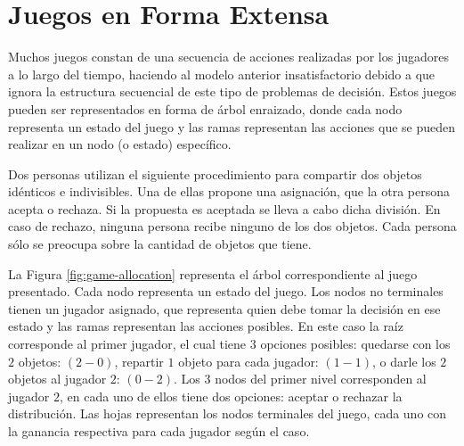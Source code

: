 \chapter{Juegos en Forma Extensa}
\label{chapter:juegos-forma-extensa}

Muchos juegos constan de una secuencia de acciones realizadas por los jugadores a lo largo del tiempo, haciendo al modelo anterior insatisfactorio debido a que ignora la estructura secuencial de este tipo de problemas de decisión. Estos juegos pueden ser representados en forma de árbol enraizado, donde cada nodo representa un estado del juego y las ramas representan las acciones que se pueden realizar en un nodo (o estado) específico. 

\begin{example}
\label{ex:game-allocation}
Dos personas utilizan el siguiente procedimiento para compartir dos objetos idénticos e indivisibles. Una de ellas propone una asignación, que la otra persona acepta o rechaza. Si la propuesta es aceptada se lleva a cabo dicha división. En caso de rechazo, ninguna persona recibe ninguno de los dos objetos. Cada persona sólo se preocupa sobre la cantidad de objetos que tiene. 
\end{example}

La Figura \ref{fig:game-allocation} representa el árbol correspondiente al juego presentado. Cada nodo representa un estado del juego. Los nodos no terminales tienen un jugador asignado, que representa quien debe tomar la decisión en ese estado y las ramas representan las acciones posibles. En este caso la raíz corresponde al primer jugador, el cual tiene $3$ opciones posibles: quedarse con los $2$ objetos: $(2-0)$, repartir $1$ objeto para cada jugador: $(1-1)$, o darle los $2$ objetos al jugador $2$: $(0-2)$. Los $3$ nodos del primer nivel corresponden al jugador $2$, en cada uno de ellos tiene dos opciones: aceptar o rechazar la distribución. Las hojas representan los nodos terminales del juego, cada uno con la ganancia respectiva para cada jugador según el caso.

